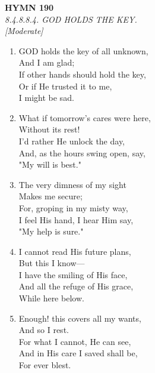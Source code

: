 \documentclass[11pt,a4paper]{article}
\begin{document}
\newpage
\begin{center}
    {\Large \textbf{HYMN 190}}
    \\
    \textit{8.4.8.8.4. GOD HOLDS THE KEY.}
    \\
    \textit{\small [Moderate]}
\end{center}
\vspace{1em}

\begin{enumerate}
    \item GOD holds the key of all unknown, \\
        And I am glad; \\
        If other hands should hold the key, \\
        Or if He trusted it to me, \\
        I might be sad.

    \item What if tomorrow's cares were here, \\
        Without its rest! \\
        I'd rather He unlock the day, \\
        And, as the hours swing open, say, \\
        "My will is best."

    \item The very dimness of my sight \\
        Makes me secure; \\
        For, groping in my misty way, \\
        I feel His hand, I hear Him say, \\
        "My help is sure."

    \item I cannot read His future plans, \\
        But this I know--- \\
        I have the smiling of His face, \\
        And all the refuge of His grace, \\
        While here below.

    \item Enough! this covers all my wants, \\
        And so I rest. \\
        For what I cannot, He can see, \\
        And in His care I saved shall be, \\
        For ever blest.

\end{enumerate}
\end{document}

